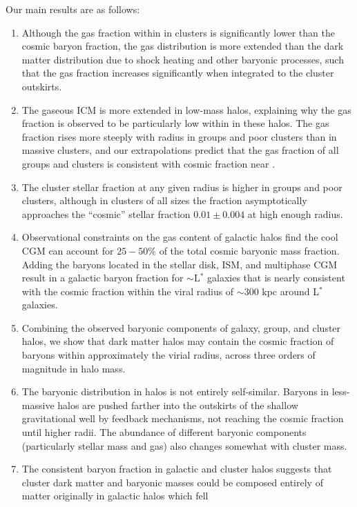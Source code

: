 Our main results are as follows:
\begin{enumerate}
\item Although the gas fraction within \rfive{} in clusters is
  significantly lower than the cosmic baryon fraction, the gas
  distribution is more extended than the dark matter distribution due
  to shock heating and other baryonic processes, such that the gas
  fraction increases significantly when integrated to the cluster
  outskirts.
\item The gaseous ICM is more extended in low-mass halos, explaining
  why the gas fraction is observed to be particularly low within
  \rfive{} in these halos. The gas fraction rises more steeply with
  radius in groups and poor clusters than in massive clusters, and our
  extrapolations predict that the gas fraction of all groups and
  clusters is consistent with cosmic fraction near \rvir{}.
\item The cluster stellar fraction at any given radius is higher in
  groups and poor clusters, although in clusters of all sizes the
  fraction asymptotically approaches the ``cosmic'' stellar fraction
  $0.01\pm0.004$ at high enough radius. 
\item Observational constraints on the gas content of galactic halos
  find the cool CGM can account for $25-50\%$ of the total cosmic
  baryonic mass fraction. Adding the baryons located in the stellar
  disk, ISM, and multiphase CGM result in a galactic baryon fraction
  for $\sim$L$^*$ galaxies that is nearly consistent with the cosmic
  fraction within the viral radius of $\sim300$ kpc around L$^*$
  galaxies.
\item Combining the observed baryonic components of galaxy, group, and
  cluster halos, we show that dark matter halos may contain the cosmic
  fraction of baryons within approximately the virial radius, across
  three orders of magnitude in halo mass.
\item The baryonic distribution in halos is not entirely
  self-similar. Baryons in less-massive halos are pushed farther into
  the outskirts of the shallow gravitational well by feedback
  mechanisms, not reaching the cosmic fraction until higher radii. The
  abundance of different baryonic components (particularly stellar
  mass and gas) also changes somewhat with cluster mass.
\item The consistent baryon fraction in galactic and cluster halos
  suggests that cluster dark matter and baryonic masses could be
  composed entirely of matter originally in galactic halos which fell

\end{enumerate}
